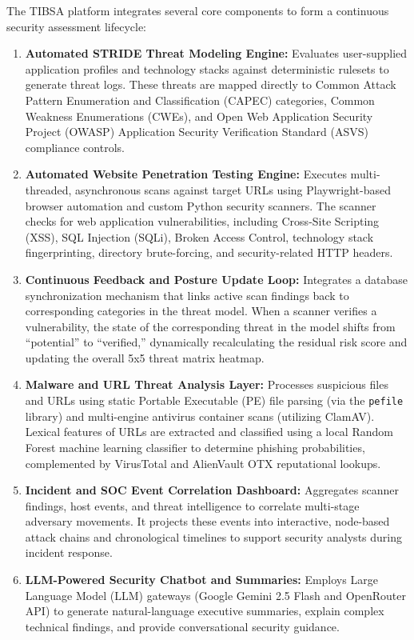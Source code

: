 The TIBSA platform integrates several core components to form a continuous security assessment lifecycle:
\begin{enumerate}
    \item \textbf{Automated STRIDE Threat Modeling Engine:} Evaluates user-supplied application profiles and technology stacks against deterministic rulesets to generate threat logs. These threats are mapped directly to Common Attack Pattern Enumeration and Classification (CAPEC) categories, Common Weakness Enumerations (CWEs), and Open Web Application Security Project (OWASP) Application Security Verification Standard (ASVS) compliance controls.
    \item \textbf{Automated Website Penetration Testing Engine:} Executes multi-threaded, asynchronous scans against target URLs using Playwright-based browser automation and custom Python security scanners. The scanner checks for web application vulnerabilities, including Cross-Site Scripting (XSS), SQL Injection (SQLi), Broken Access Control, technology stack fingerprinting, directory brute-forcing, and security-related HTTP headers.
    \item \textbf{Continuous Feedback and Posture Update Loop:} Integrates a database synchronization mechanism that links active scan findings back to corresponding categories in the threat model. When a scanner verifies a vulnerability, the state of the corresponding threat in the model shifts from ``potential'' to ``verified,'' dynamically recalculating the residual risk score and updating the overall 5x5 threat matrix heatmap.
    \item \textbf{Malware and URL Threat Analysis Layer:} Processes suspicious files and URLs using static Portable Executable (PE) file parsing (via the \texttt{pefile} library) and multi-engine antivirus container scans (utilizing ClamAV). Lexical features of URLs are extracted and classified using a local Random Forest machine learning classifier to determine phishing probabilities, complemented by VirusTotal and AlienVault OTX reputational lookups.
    \item \textbf{Incident and SOC Event Correlation Dashboard:} Aggregates scanner findings, host events, and threat intelligence to correlate multi-stage adversary movements. It projects these events into interactive, node-based attack chains and chronological timelines to support security analysts during incident response.
    \item \textbf{LLM-Powered Security Chatbot and Summaries:} Employs Large Language Model (LLM) gateways (Google Gemini 2.5 Flash and OpenRouter API) to generate natural-language executive summaries, explain complex technical findings, and provide conversational security guidance.
\end{enumerate}

